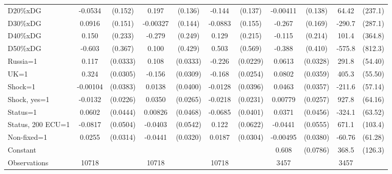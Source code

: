 \begin{tabular}{l|cccccc|cc|cc}
D20\%xDG        &  -0.0534         &  (0.152)&    0.197         &  (0.136)&   -0.144         &  (0.137)& -0.00411         &  (0.138)&    64.42         &  (237.1)\\
D30\%xDG        &   0.0916         &  (0.151)& -0.00327         &  (0.144)&  -0.0883         &  (0.155)&   -0.267         &  (0.169)&   -290.7         &  (287.1)\\
D40\%xDG        &    0.150         &  (0.233)&   -0.279         &  (0.249)&    0.129         &  (0.215)&   -0.115         &  (0.214)&    101.4         &  (364.8)\\
D50\%xDG        &   -0.603         &  (0.367)&    0.100         &  (0.429)&    0.503         &  (0.569)&   -0.388         &  (0.410)&   -575.8         &  (812.3)\\
Russia=1        &    0.117\sym{***}& (0.0333)&    0.108\sym{***}& (0.0333)&   -0.226\sym{***}& (0.0229)&   0.0613\sym{*}  & (0.0328)&    291.8\sym{***}&  (54.40)\\
UK=1            &    0.324\sym{***}& (0.0305)&   -0.156\sym{***}& (0.0309)&   -0.168\sym{***}& (0.0254)&   0.0802\sym{**} & (0.0359)&    405.3\sym{***}&  (55.50)\\
Shock=1         & -0.00104         & (0.0383)&   0.0138         & (0.0400)&  -0.0128         & (0.0396)&   0.0463         & (0.0357)&   -211.6\sym{***}&  (57.14)\\
Shock, yes=1    &  -0.0132         & (0.0226)&   0.0350         & (0.0265)&  -0.0218         & (0.0231)&  0.00779         & (0.0257)&    927.8\sym{***}&  (64.16)\\
Status=1        &   0.0602         & (0.0444)&  0.00826         & (0.0468)&  -0.0685\sym{*}  & (0.0401)&   0.0371         & (0.0456)&   -324.1\sym{***}&  (63.52)\\
Status, 200 ECU=1&  -0.0817         & (0.0504)&  -0.0403         & (0.0542)&    0.122\sym{**} & (0.0622)&  -0.0441         & (0.0555)&    671.1\sym{***}&  (103.4)\\
Non-fixed=1     &   0.0255         & (0.0314)&  -0.0441         & (0.0320)&   0.0187         & (0.0304)& -0.00495         & (0.0380)&   -60.76         &  (61.28)\\
Constant        &                  &         &                  &         &                  &         &    0.608\sym{***}& (0.0786)&    368.5\sym{***}&  (126.3)\\
\hline
Observations    &    10718         &         &    10718         &         &    10718         &         &     3457         &         &     3457         &         \\

\end{tabular}
